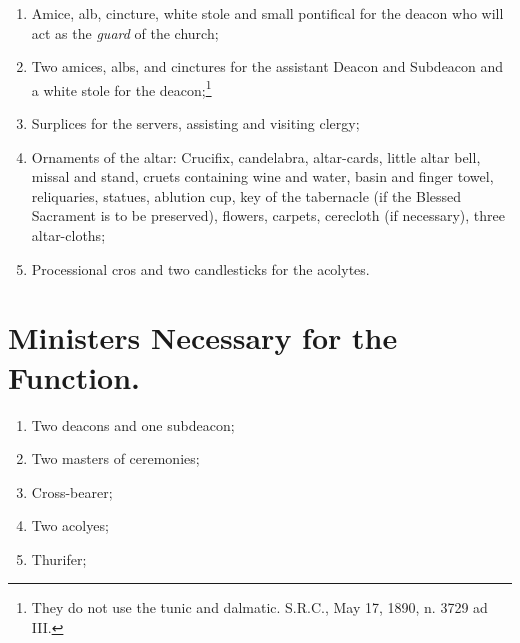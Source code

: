 \documentclass[letterpaper]{report}
\newcommand\src{\textsc{S.R.C.}}
\begin{document}
{\begin{enumerate}[label=\Roman*.]
\begin{enumerate}[label=\arabic*.]
                \item Amice, alb, cincture, white stole and small pontifical
                    for the deacon who will act as the \textit{guard} of the
                    church;

                \item Two amices, albs, and cinctures for the assistant Deacon
                    and Subdeacon and a white stole for the
                    deacon;\footnote{They do not use the tunic and dalmatic.
                    \src, May 17, 1890, n. 3729 ad III.}

                \item Surplices for the servers, assisting and visiting clergy;

                \item Ornaments of the altar: Crucifix, candelabra,
                    altar-cards, little altar bell, missal and stand, cruets
                    containing wine and water, basin and finger towel,
                    reliquaries, statues, ablution cup, key of the tabernacle
                    (if the Blessed Sacrament is to be preserved), flowers,
                    carpets, cerecloth (if necessary), three altar-cloths;

                \item Processional cros and two candlesticks for the acolytes.

            \end{enumerate}

    \end{enumerate}

    \section{Ministers Necessary for the Function.}

    \begin{enumerate}[label=\Roman*.]

        \item Two deacons and one subdeacon;

        \item Two masters of ceremonies;

        \item Cross-bearer;

        \item Two acolyes;

        \item Thurifer;


\end{enumerate}}
\end{document}
